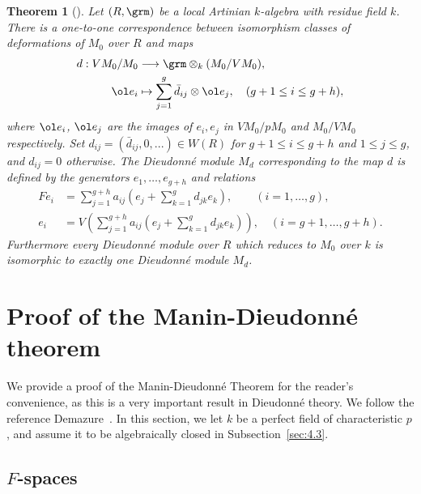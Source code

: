 \documentclass[]{amsart}
\theoremstyle{plain}
\newtheorem{thm}{Theorem}
\theoremstyle{definition}
\theoremstyle{remark}
\newcommand{\<}{\langle}   %
\renewcommand{\>}{\rangle} %
\newcommand{\dieu}{Dieudonn\'{e} }
\begin{document}
 \begin{thm}[{\cite[Theorem 1]{norman:algo}}]\label{thm:defo}
    Let $(R,\grm)$ be a local Artinian $k$-algebra with residue field $k$.  
    There is a one-to-one correspondence between isomorphism classes of deformations of $M_0$ over $R$ and maps 
    \[ \begin{split}
        d: VM_0/M_0 & \longrightarrow \grm \otimes_k  (M_0/ V M_0),\\ \ol e_i & \mapsto \sum_{j=1}^g \bar d_{ij} \otimes \ol e_j, \quad (g+1\le i \le g+h),
    \end{split} \]
    where $\ol e_i$, $\ol e_j$ are the images of $e_i, e_j$ in $VM_0/p M_0$ and $M_0/ V M_0$ respectively. Set
 $d_{ij} = (\bar d_{ij}, 0, ...) \in W(R)$ for $g+1\le i \le g+h$ and $1\le j \le g$, and $d_{ij} = 0$ otherwise. The \dieu module $M_d$ corresponding to the map $d$ is defined by the generators $e_1,\dots, e_{g+h}$ and relations
\begin{equation}\label{eq:2.4}
    \begin{split}
    F e_i &=\sum_{j=1}^{g+h} a_{ij} \left (e_j+\sum_{k=1}^g d_{jk} e_k \right ), \quad  \quad (i=1,\dots, g), \\ 
    e_i &= V\left (\sum_{j=1}^{g+h} a_{ij} \left (e_j+\sum_{k=1}^g d_{jk} e_k \right ) \right ),  \quad (i=g + 1, \dots, g + h).  
\end{split}
\end{equation} 
 Furthermore every \dieu module over $R$ which reduces to $M_0$ over $k$ is isomorphic to exactly one \dieu module $M_d$. 
 \end{thm}
 



\section{Proof of the Manin-\dieu theorem}

We provide a proof of the Manin-\dieu Theorem for the reader's convenience, as this is a very important result in \dieu theory. We follow the reference Demazure~\cite{demazure}. 
In this section, we let $k$ be a perfect field of characteristic $p$, and assume it to be algebraically closed in Subsection~\ref{sec:4.3}.

\subsection{$F$-spaces}
\end{document}
